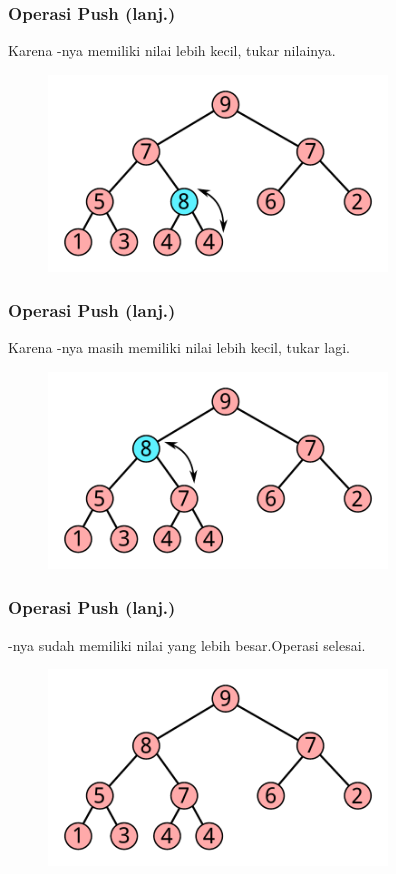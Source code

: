 \begin{frame}
\frametitle{Operasi Push (lanj.)}
Karena -nya memiliki nilai lebih kecil, tukar nilainya.
\begin{figure}
  \includegraphics[width=9cm]{asset/push-2.pdf}
\end{figure}
\end{frame}

\begin{frame}
\frametitle{Operasi Push (lanj.)}
Karena -nya masih memiliki nilai lebih kecil, tukar lagi.
\begin{figure}
  \includegraphics[width=9cm]{asset/push-3.pdf}
\end{figure}
\end{frame}

\begin{frame}
\frametitle{Operasi Push (lanj.)}
-nya sudah memiliki nilai yang lebih besar.\newline Operasi  selesai.
\begin{figure}
  \includegraphics[width=9cm]{asset/push-4.pdf}
\end{figure}
\end{frame}

